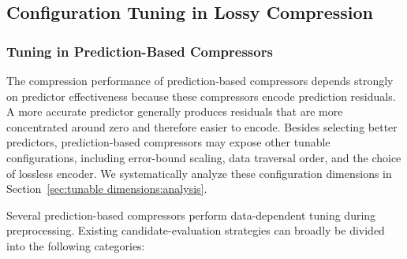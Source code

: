 \subsection{Configuration Tuning in Lossy Compression}\label{sec:related work:tuning}

\subsubsection{Tuning in Prediction-Based Compressors}\mbox{}

The compression performance of prediction-based compressors depends strongly on predictor effectiveness because these compressors encode prediction residuals. A more accurate predictor generally produces residuals that are more concentrated around zero and therefore easier to encode. Besides selecting better predictors, prediction-based compressors may expose other tunable configurations, including error-bound scaling, data traversal order, and the choice of lossless encoder. We systematically analyze these configuration dimensions in Section~\ref{sec:tunable dimensions:analysis}.

Several prediction-based compressors perform data-dependent tuning during preprocessing. Existing candidate-evaluation strategies can broadly be divided into the following categories:

